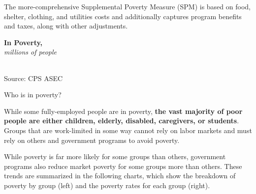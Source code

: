 \documentclass{report}
\newcommand{\barylab}[2]{yticklabel style={text width=#1, align=right, 
		style={black!70}, text height=#2},}
\newcommand{\bbar}[2]{extra #1 ticks = {{#2}}, extra #1 tick labels = ,
		extra #1 tick style = {grid=major, grid style={thick, black!25}},}
\newcommand{\barplotnogrid}{xbar=0pt, axis line style={draw=none},
	    yticklabel style={align=left, anchor=east},
      		xmajorticks=false, ymajorgrids=false,   
	    ytick=data, tickwidth=0pt, area legend, reverse legend,
	    nodes near coords align={horizontal},}
\begin{document}
{\begin{minipage}{0.76\textwidth}
The more-comprehensive Supplemental Poverty Measure (SPM) is based on food, shelter, clothing, and utilities costs and additionally captures program benefits and taxes, along with other adjustments. 
\end{minipage} \hspace{6mm}
\begin{minipage}{0.19\textwidth}
\normalsize \textbf{In Poverty, }\\
\footnotesize{\textit{millions of people}}\\
  \hspace*{-3mm} \\
\footnotesize{Source: CPS ASEC}
\vfill
\end{minipage}
\vspace{1.5mm}

\begin{minipage}{0.76\textwidth}
\normalsize Who is in poverty?
\vspace{-0.5mm}

\small While some fully-employed people are in poverty, \textbf{the vast majority of poor people are either children, elderly, disabled, caregivers, or students}. Groups that are work-limited in some way cannot rely on labor markets and must rely on others and government programs to avoid poverty.  

While poverty is far more likely for some groups than others, government programs also reduce market poverty for some groups more than others. These trends are summarized in the following charts, which show the breakdown of poverty by group (left) and the poverty rates for each group (right). 



\end{minipage}}
\end{document}
